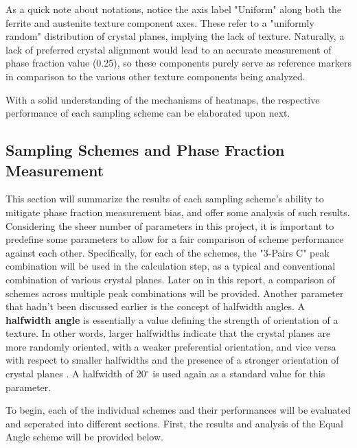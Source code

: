 \documentclass[10pt]{article}
\begin{document}
As a quick note about notations, notice the axis label "Uniform" along both the 
ferrite and austenite texture component axes. These refer to a "uniformly random" distribution
of crystal planes, implying the lack of texture. Naturally, a lack of preferred crystal alignment 
would lead to an accurate measurement of phase fraction value (0.25), so these components purely serve as 
reference markers in comparison to the various other texture components being analyzed.

With a solid understanding of the mechanisms of heatmaps, the respective performance of each sampling scheme can be elaborated upon next.

\subsection{Sampling Schemes and Phase Fraction Measurement}
This section will summarize the results of each sampling scheme's ability to mitigate phase fraction measurement bias, and offer some analysis of such results.
Considering the sheer number of parameters in this project, it is important to predefine some parameters to allow for a fair comparison of scheme performance against
each other. Specifically, for each of the schemes, the "3-Pairs C" peak combination will be used in the calculation step, as a typical and conventional combination
of various crystal planes. Later on in this report, a comparison of schemes across multiple peak combinations will be provided. 
Another parameter that hadn't been discussed earlier is the concept of halfwidth angles. A \textbf{halfwidth angle} is essentially a 
value defining the strength of orientation of a texture. In other words, larger halfwidths indicate that the crystal planes are more randomly oriented, with a 
weaker preferential orientation, and vice versa with respect to smaller halfwidths and the presence of a stronger orientation of crystal planes \cite{ref14}. 
A halfwidth of 20$^{\circ}$ is used again as a standard 
value for this parameter. 

To begin, each of the individual schemes and their performances will be evaluated and seperated into different sections. First, the results and analysis of the
Equal Angle scheme will be provided below.
\end{document}

